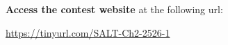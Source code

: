 \providecommand{\titlepagecoverimg}{img/auxl/cover.png}

\providecommand{\prefacenotesIO}{}
\providecommand{\prefacenotesinteractive}{}
\providecommand{\prefacenotesadditional}{}












\newcommand\preem{smiling-face-with-sunglasses}

\cleardoublepage



\textbf{Access the contest website} at the following url:
\begin{center}
    \url{https://tinyurl.com/SALT-Ch2-2526-1}
\end{center}
\bigskip

